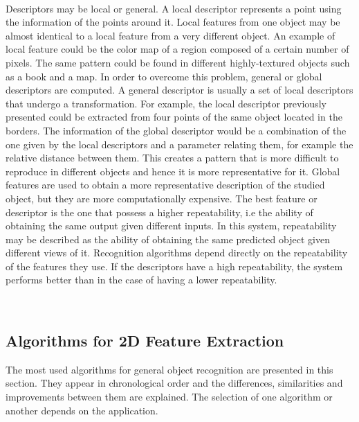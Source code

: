 \\

Descriptors may be local or general. 
A local descriptor represents a point using the information of the points around it. 
Local features from one object may be almost identical to a local feature from a very different object. 
An example of local feature could be the color map of a region composed of a certain number of pixels. 
The same pattern could be found in different highly-textured objects such as a book and a map. 
In order to overcome this problem, general or global descriptors are computed. 
A general descriptor is usually a set of local descriptors that undergo a transformation. 
For example, the local descriptor previously presented could be extracted from four points of the same object located in the borders. 
The information of the global descriptor would be a combination of the one given by the local descriptors and a parameter relating them, for example the relative distance between them. 
This creates a pattern that is more difficult to reproduce in different objects and hence it is more representative for it. 
Global features are used to obtain a more representative description of the studied object, but they are more computationally expensive. 
The best feature or descriptor is the one that possess a higher repeatability, i.e the ability of obtaining the same output given different inputs. 
In this system, repeatability may be described as the ability of obtaining the same predicted object given different views of it. 
Recognition algorithms depend directly on the repeatability of the features they use. 
If the descriptors have a high repeatability, the system performs better than in the case of having a lower repeatability. 

\\

\subsection{Algorithms for 2D Feature Extraction}
\label{2d_features}


The most used algorithms for general object recognition are presented in this section. 
They appear in chronological order and the differences, similarities and improvements between them are explained. 
The selection of one algorithm or another depends on the application.


